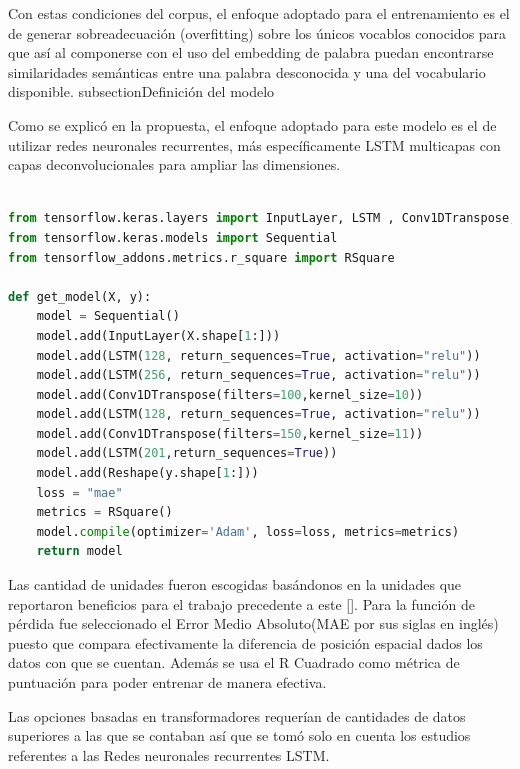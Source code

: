 Con estas condiciones del corpus, el enfoque adoptado para el entrenamiento es el de generar sobreadecuación (overfitting) sobre los únicos vocablos conocidos para que así al componerse con el uso del embedding de palabra puedan encontrarse similaridades semánticas entre una palabra desconocida y una del vocabulario disponible.
subsection{Definición del modelo}

Como se explicó en la propuesta, el enfoque adoptado para este modelo es el de utilizar redes neuronales recurrentes, más específicamente LSTM multicapas con capas deconvolucionales para ampliar las dimensiones.
\begin{lstlisting}[language=Python, caption={Diseño del modelo}]

from tensorflow.keras.layers import InputLayer, LSTM , Conv1DTranspose, Reshape
from tensorflow.keras.models import Sequential
from tensorflow_addons.metrics.r_square import RSquare

def get_model(X, y):
    model = Sequential()
    model.add(InputLayer(X.shape[1:]))
    model.add(LSTM(128, return_sequences=True, activation="relu"))
    model.add(LSTM(256, return_sequences=True, activation="relu"))
    model.add(Conv1DTranspose(filters=100,kernel_size=10))
    model.add(LSTM(128, return_sequences=True, activation="relu"))
    model.add(Conv1DTranspose(filters=150,kernel_size=11))
    model.add(LSTM(201,return_sequences=True))
    model.add(Reshape(y.shape[1:]))
    loss = "mae"
    metrics = RSquare()
    model.compile(optimizer='Adam', loss=loss, metrics=metrics)
    return model
\end{lstlisting}

Las cantidad de unidades fueron escogidas basándonos en la unidades que reportaron beneficios para el trabajo precedente a este [\cite{leynier-lsc-2021}].
Para la función de pérdida fue seleccionado el Error Medio Absoluto(MAE por sus siglas en inglés) puesto que compara efectivamente la diferencia de posición espacial dados los datos con que se cuentan.
Además se usa el R Cuadrado como métrica de puntuación para poder entrenar de manera efectiva.


Las opciones basadas en transformadores requerían de cantidades de datos superiores a las que se contaban así que se tomó solo en cuenta los estudios referentes a las Redes neuronales recurrentes LSTM.


